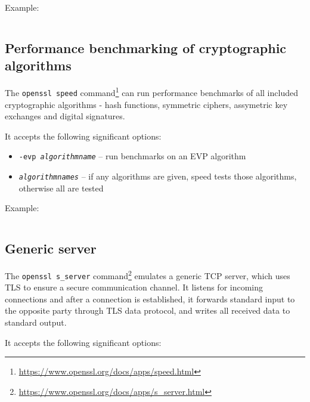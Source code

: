 Example:

\inputminted{text}{code/openssl-enc-example.txt}


\subsection{Performance benchmarking of cryptographic algorithms}

The \texttt{openssl speed} command\footnote{\url{https://www.openssl.org/docs/apps/speed.html}} can run performance benchmarks of all included cryptographic algorithms - hash functions, symmetric ciphers, assymetric key exchanges and digital signatures.

It accepts the following significant options:

\begin{itemize}
  \item \texttt{-evp \textit{algorithmname}} -- run benchmarks on an EVP algorithm
  \item \texttt{\textit{algorithmnames}} -- if any algorithms are given, speed tests those algorithms, otherwise all are tested
\end{itemize}

Example:

\inputminted{text}{code/openssl-speed-example.txt}


\subsection{Generic server}
\label{toc/openssl-s_server}

The \texttt{openssl s\_server} command\footnote{\url{https://www.openssl.org/docs/apps/s\_server.html}} emulates a generic TCP server, which uses TLS to ensure a secure communication channel. It listens for incoming connections and after a connection is established, it forwards standard input to the opposite party through TLS data protocol, and writes all received data to standard output.

It accepts the following significant options:

